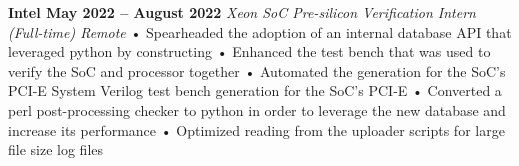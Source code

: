 \documentclass[../main.tex]{subfiles}
\begin{document}
%
\noindent\textbf{{\fontsize{\textFontSize}{\textFontBox}\selectfont Intel \hfill May 2022 – August 2022}}
\vspace{\jobHeaderDist}\newline
%
{\fontsize{\textFontSize}{\textFontBox}\selectfont\emph{Xeon SoC Pre-silicon Verification Intern (Full-time) \hfill Remote \hspace{0 cm}}}
\vspace{0mm}\newline
%
%
{\fontsize{\textFontSize}{\textFontBox}\selectfont • Spearheaded the adoption of an internal database API that leveraged python by constructing }\newline
{\fontsize{\textFontSize}{\textFontBox}\selectfont • Enhanced the test bench that was used to verify the SoC and processor together }\newline
{\fontsize{\textFontSize}{\textFontBox}\selectfont • Automated the generation for the SoC's PCI-E System Verilog test bench generation for the SoC's PCI-E }\newline
{\fontsize{\textFontSize}{\textFontBox}\selectfont • Converted a perl post-processing checker to python in order to leverage the new database and increase its performance }\newline
{\fontsize{\textFontSize}{\textFontBox}\selectfont • Optimized reading from the uploader scripts for large file size log files }\newline
%
%
%
\end{document}
